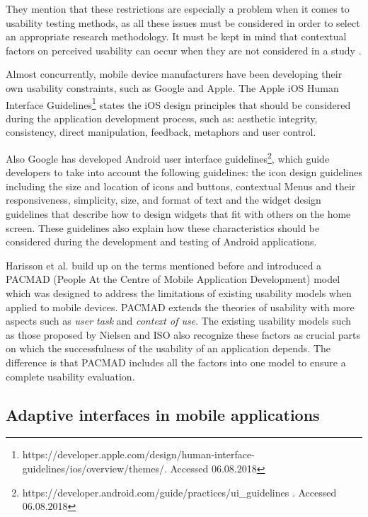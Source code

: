 They mention that these restrictions are especially a problem when it comes to usability testing methods, as all these issues must be considered in order to select an appropriate research methodology. It must be kept in mind that contextual factors on perceived usability can occur when they are not considered in a study \cite{zhang2005challenges}.

Almost concurrently, mobile device manufacturers have been developing their own usability constraints, such as Google and Apple. The Apple iOS Human Interface Guidelines\footnote{https://developer.apple.com/design/human-interface-guidelines/ios/overview/themes/. Accessed 06.08.2018} states the iOS design principles that should be considered during the application development process, such as: aesthetic integrity, consistency, direct manipulation, feedback, metaphors and user control. 

Also Google has developed Android user interface guidelines\footnote{https://developer.android.com/guide/practices/ui\_guidelines . Accessed 06.08.2018}, which guide developers to take into account the following guidelines: the icon design guidelines including the size and location of icons and buttons, contextual Menus and their responsiveness, simplicity, size, and format of text and the widget design guidelines that describe how to design widgets that fit with others on the home screen. These guidelines also explain how these characteristics should be considered during the development and testing of Android applications. 

Harisson et al. \cite{harrison2013usability} build up on the terms mentioned before and introduced a PACMAD (People At the Centre of Mobile Application Development) model which was designed to address the limitations of existing usability models when applied to mobile devices. PACMAD extends the theories of usability with more aspects such as \textit{user task} and \textit{context of use}. The existing usability models such as those proposed by Nielsen \cite{nielsen1994usability} and ISO \cite{bevan1998iso} also recognize these factors as crucial parts on which the successfulness of the usability of an application depends. The difference is that PACMAD includes all the factors into one model to ensure a complete usability evaluation.

\subsection{Adaptive interfaces in mobile applications}

